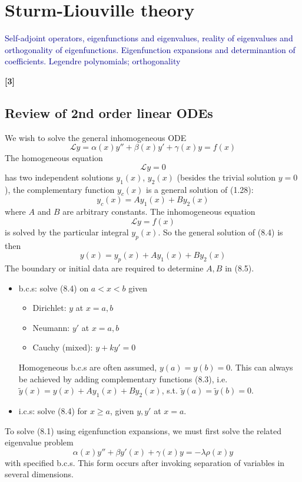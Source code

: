 \documentclass[a4paper]{article}
\begin{document}
\newpage
\section{Sturm-Liouville theory}
{\small\textcolor{darkblue}{Self-adjoint operators, eigenfunctions and eigenvalues, reality of eigenvalues and orthogonality of eigenfunctions. Eigenfunction expansions and determinantion of coefficients. Legendre polynomials; orthogonality}

\hfill\textbf{[3]}}
\subsection{Review of 2nd order linear ODEs}
We wish to solve the general inhomogeneous ODE
\begin{equation}
    \mathcal{L}y=\alpha(x)y''+\beta(x)y'+\gamma(x)y=f(x)\tag{8.1}
\end{equation}
The homogeneous equation
\begin{equation}
    \mathcal{L}y=0\tag{8.2}
\end{equation}
has two independent solutions $y_1(x)$, $y_2(x)$ (besides the trivial solution $y=0$), the complementary function $y_c(x)$ is a general solution of (1.28):
\begin{equation}
y_c(x)=Ay_1(x)+By_2(x)\tag{8.3}
\end{equation}
where $A$ and $B$ are arbitrary constants. The inhomogeneous equation
\begin{equation}
    \mathcal{L}y=f(x)\tag{8.4}
\end{equation}
is solved by the particular integral $y_p(x)$. So the general solution of (8.4) is then
\begin{equation}
    y(x)=y_p(x)+Ay_1(x)+By_2(x)\tag{8.5}
\end{equation}
The boundary or initial data are required to determine $A,B$ in (8.5).
\begin{itemize}
    \item b.c.s: solve (8.4) on $a<x<b$ given 
    \begin{itemize}
        \item Dirichlet:
    $y$ at $x=a,b$
    \item Neumann:
    $y'$ at $x=a,b$
    \item Cauchy (mixed):
    $y+ky'=0$
    \end{itemize}
    Homogeneous b.c.s are often assumed, $y(a)=y(b)=0$. This can always be achieved by adding complementary functions (8.3), i.e. $\tilde{y}(x)=y(x)+Ay_1(x)+By_2(x)$, s.t. $\tilde{y}(a)=\tilde{y}(b)=0$.
    \item i.c.s: solve (8.4) for $x\geq a$, given $y,y'$ at $x=a$.
\end{itemize}
To solve (8.1) using eigenfunction expansions, we must first solve the related eigenvalue problem
\begin{equation}
    \alpha(x)y''+\beta y'(x)+\gamma(x)y=-\lambda\rho(x)y\tag{8.6}
\end{equation}
with specified b.c.s. This form occurs after invoking separation of variables in several dimensions.
\end{document}
